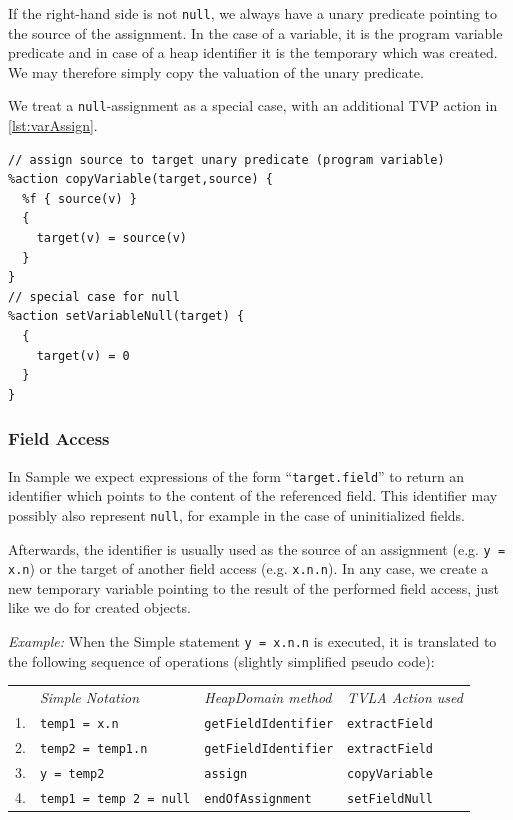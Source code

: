 \documentclass[11pt,a4paper,english]{article}
\begin{document}
If the right-hand side is not \texttt{null}, we always have a unary predicate
pointing to the source of the assignment. In the case of a variable, it is the
program variable predicate and in case of a heap identifier it is the temporary
which was created. We may therefore simply copy the valuation of the unary
predicate.

We treat a \texttt{null}-assignment as a special case, with an additional TVP
action in \autoref{lst:varAssign}.
\begin{lstlisting}[language=tvp,caption={Action for Variable Assignment},label=lst:varAssign]
// assign source to target unary predicate (program variable)
%action copyVariable(target,source) {
  %f { source(v) }
  {
    target(v) = source(v)
  }
}
// special case for null
%action setVariableNull(target) {
  {
    target(v) = 0
  }
}
\end{lstlisting}


\subsubsection{Field Access}
In Sample we expect expressions of the form ``\lstinline!target.field!'' to
return an identifier which points to the content of the referenced field. This
identifier may possibly also represent \texttt{null}, for example in the case of
uninitialized fields. 

Afterwards, the identifier is usually used as the source of an
assignment (e.g. \lstinline!y = x.n!) or the target of another field access
(e.g. \lstinline!x.n.n!). In any case, we create a new temporary variable
pointing to the result of the performed field access, just like we do for
created objects.

\textit{Example: } When the Simple statement \texttt{y = x.n.n} is executed, it
is translated to the following sequence of operations (slightly simplified
pseudo code): 


  \begin{tabular}[h]{l l|l|l}
    & \emph{Simple Notation} & \emph{HeapDomain method} & \emph{TVLA Action used} \\
    1. & \lstinline!temp1 = x.n! & \texttt{getFieldIdentifier} & \texttt{extractField} \\
    2. & \lstinline!temp2 = temp1.n! & \texttt{getFieldIdentifier} & \texttt{extractField} \\
    3. & \lstinline!y = temp2! & \texttt{assign} & \texttt{copyVariable} \\
    4. &\lstinline!temp1 = temp 2 = null! & \texttt{endOfAssignment} &
    \texttt{setFieldNull} \\
  \end{tabular}
\end{document}
